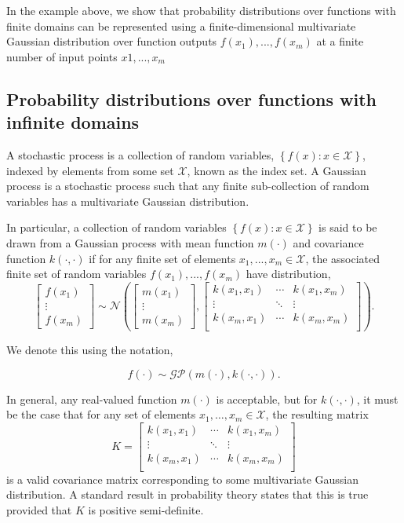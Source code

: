 \documentclass{article}
\begin{document}
In the example above, we show that probability distributions over functions with finite domains can be represented using a finite-dimensional multivariate Gaussian distribution over function outputs $f(x_1),...,f(x_m)$ at a finite number of input points $x1, ..., x_m$
\subsection{Probability distributions over functions with infinite domains}
A stochastic process is a collection of random variables, $\left \{ f(x): x \in \mathcal{X} \right \}$, indexed by elements from some set $\mathcal{X}$, known as the index set. A Gaussian process is a stochastic process such that any finite sub-collection of random variables has a multivariate Gaussian distribution.

In particular, a collection of random variables $\left \{ f(x): x \in \mathcal{X} \right \}$ is said to be drawn from a Gaussian process with mean function $m(\cdot)$ and covariance function $k(\cdot , \cdot)$ if for any finite set of elements $x_1,...,x_m \in \mathcal{X}$, the associated finite set of random variables $f(x_1),...,f(x_m)$ have distribution,
$$\begin{bmatrix}
f(x_1)\\
\vdots \\
f(x_m) 
\end{bmatrix} \sim \mathcal{N} \left( 
\begin{bmatrix}
m(x_1)\\
\vdots \\
m(x_m) 
\end{bmatrix}, \begin{bmatrix}
k(x_1, x_1) & \cdots & k(x_1, x_m) \\
\vdots & \ddots & \vdots\\
k(x_m, x_1) & \cdots & k(x_m, x_m) \\
\end{bmatrix} 
\right).$$

We denote this using the notation,

$$f(\cdot) \sim \mathcal{GP}(m(\cdot), k(\cdot, \cdot)).$$

In general, any real-valued function $m(\cdot)$ is acceptable, but for $k(\cdot, \cdot)$, it must be the case that for any set of elements $x_1, \dotsc, x_m \in \mathcal{X}$, the resulting matrix
$$K = \begin{bmatrix}
k(x_1, x_1) & \cdots & k(x_1, x_m) \\
\vdots & \ddots & \vdots\\
k(x_m, x_1) & \cdots & k(x_m, x_m) \\
\end{bmatrix} $$
is a valid covariance matrix corresponding to some multivariate
Gaussian distribution. A standard result in probability theory states
that this is true provided that $K$ is positive semi-definite.
\end{document}
